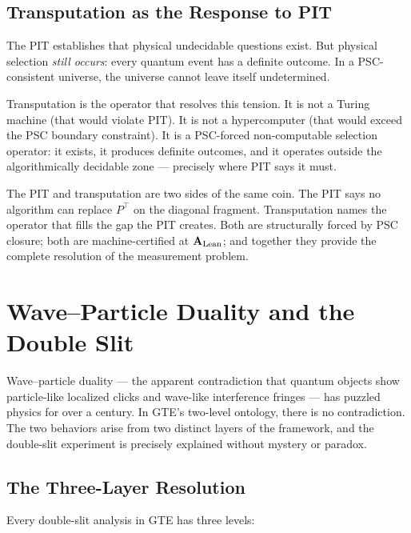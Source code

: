 \documentclass[11pt,openany]{book}
\theoremstyle{remark}
\newcommand{\CatAL}{\ensuremath{\textbf{A}_{\rm Lean}}}
\begin{document}
\subsection*{Transputation as the Response to PIT}

The PIT establishes that physical undecidable questions exist.  But physical selection
\emph{still occurs}: every quantum event has a definite outcome.  In a PSC-consistent
universe, the universe cannot leave itself undetermined.

Transputation is the operator that resolves this tension.  It is not a Turing machine
(that would violate PIT).  It is not a hypercomputer (that would exceed the PSC boundary
constraint).  It is a PSC-forced non-computable selection operator: it exists, it
produces definite outcomes, and it operates outside the algorithmically decidable zone
--- precisely where PIT says it must.

The PIT and transputation are two sides of the same coin.  The PIT says no algorithm
can replace $P^\top$ on the diagonal fragment.  Transputation names the operator that
fills the gap the PIT creates.  Both are structurally forced by PSC closure; both are
machine-certified at \CatAL; and together they provide the complete resolution of the
measurement problem.

\section{Wave--Particle Duality and the Double Slit}
\label{sec:dslit}

Wave--particle duality --- the apparent contradiction that quantum objects show
particle-like localized clicks and wave-like interference fringes --- has puzzled physics
for over a century.  In GTE's two-level ontology, there is no contradiction.  The two
behaviors arise from two distinct layers of the framework, and the double-slit experiment
is precisely explained without mystery or paradox.

\subsection*{The Three-Layer Resolution}

Every double-slit analysis in GTE has three levels:
\end{document}
